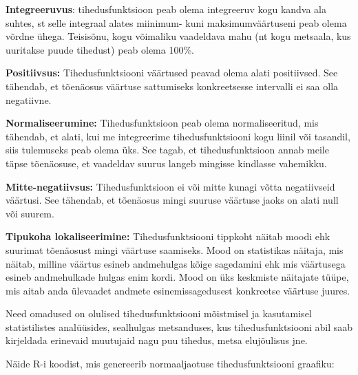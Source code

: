 \documentclass[
]{book}
\newenvironment{Shaded}{\begin{snugshade}}{\end{snugshade}}
\newcommand{\AttributeTok}[1]{\textcolor[rgb]{0.13,0.29,0.53}{#1}}
\newcommand{\CommentTok}[1]{\textcolor[rgb]{0.56,0.35,0.01}{\textit{#1}}}
\newcommand{\DecValTok}[1]{\textcolor[rgb]{0.00,0.00,0.81}{#1}}
\newcommand{\FloatTok}[1]{\textcolor[rgb]{0.00,0.00,0.81}{#1}}
\newcommand{\FunctionTok}[1]{\textcolor[rgb]{0.13,0.29,0.53}{\textbf{#1}}}
\newcommand{\NormalTok}[1]{#1}
\newcommand{\OtherTok}[1]{\textcolor[rgb]{0.56,0.35,0.01}{#1}}
\newcommand{\SpecialCharTok}[1]{\textcolor[rgb]{0.81,0.36,0.00}{\textbf{#1}}}
\newcommand{\StringTok}[1]{\textcolor[rgb]{0.31,0.60,0.02}{#1}}
\renewenvironment{Shaded} {\begin{snugshade}\footnotesize} {\end{snugshade}}
\begin{document}
\textbf{Integreeruvus}: tihedusfunktsioon peab olema integreeruv kogu kandva ala suhtes, st selle integraal alates miinimum- kuni maksimumväärtuseni peab olema võrdne ühega. Teisisõnu, kogu võimaliku vaadeldava mahu (nt kogu metsaala, kus uuritakse puude tihedust) peab olema 100\%.

\textbf{Positiivsus:} Tihedusfunktsiooni väärtused peavad olema alati positiivsed. See tähendab, et tõenäosus väärtuse sattumiseks konkreetsesse intervalli ei saa olla negatiivne.

\textbf{Normaliseerumine:} Tihedusfunktsioon peab olema normaliseeritud, mis tähendab, et alati, kui me integreerime tihedusfunktsiooni kogu liinil või tasandil, siis tulemuseks peab olema üks. See tagab, et tihedusfunktsioon annab meile täpse tõenäosuse, et vaadeldav suurus langeb mingisse kindlasse vahemikku.

\textbf{Mitte-negatiivsus:} Tihedusfunktsioon ei või mitte kunagi võtta negatiivseid väärtusi. See tähendab, et tõenäosus mingi suuruse väärtuse jaoks on alati null või suurem.

\textbf{Tipukoha lokaliseerimine:} Tihedusfunktsiooni tippkoht näitab moodi ehk suurimat tõenäosust mingi väärtuse saamiseks. Mood on statistikas näitaja, mis näitab, milline väärtus esineb andmehulgas kõige sagedamini ehk mis väärtusega esineb andmehulkade hulgas enim kordi. Mood on üks keskmiste näitajate tüüpe, mis aitab anda ülevaadet andmete esinemissagedusest konkreetse väärtuse juures.

Need omadused on olulised tihedusfunktsiooni mõistmisel ja kasutamisel statistilistes analüüsides, sealhulgas metsanduses, kus tihedusfunktsiooni abil saab kirjeldada erinevaid muutujaid nagu puu tihedus, metsa elujõulisus jne.

Näide R-i koodist, mis genereerib normaaljaotuse tihedusfunktsiooni graafiku:

\begin{Shaded}
\end{Shaded}
\end{document}
